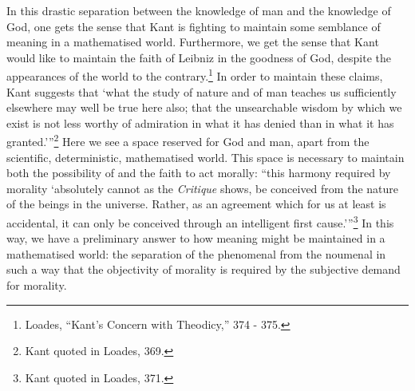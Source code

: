 \documentclass[12pt]{article}
\begin{document}
	
	In this drastic separation between the knowledge of man and the knowledge of God, one gets the sense that Kant is fighting to maintain some semblance of meaning in a mathematised world. Furthermore, we get the sense that Kant would like to maintain the faith of Leibniz in the goodness of God, despite the appearances of the world to the contrary.\footnote{Loades, ``Kant's Concern with Theodicy,'' 374 - 375.} In order to maintain these claims, Kant suggests that `what the study of nature and of man teaches us sufficiently elsewhere may well be true here also; that the unsearchable wisdom by which we exist is not less worthy of admiration in what it has denied than in what it has granted.'\thinspace''\footnote{Kant quoted in Loades, 369.}  Here we see a space reserved for God and man, apart from the scientific, deterministic, mathematised world. This space is necessary to maintain both the possibility of and the faith to act morally: ``this harmony required by morality `absolutely cannot as the \emph{Critique} shows, be conceived from the nature of the beings in the universe. Rather, as an agreement which for us at least is accidental, it can only be conceived through an intelligent first cause.'\thinspace''\footnote{Kant quoted in Loades, 371.} In this way, we have a preliminary answer to how meaning might be maintained in a mathematised world: the separation of the phenomenal from the noumenal in such a way that the objectivity of morality is required by the subjective demand for morality.
	
\end{document}
